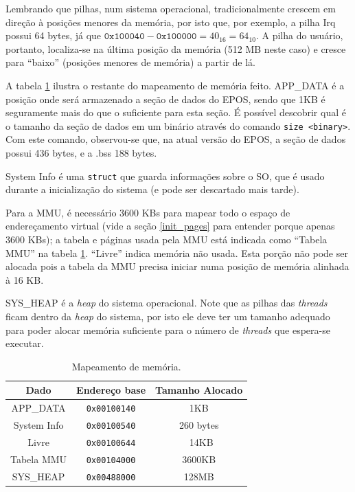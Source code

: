 Lembrando que pilhas, num sistema operacional, tradicionalmente crescem em direção à posições menores da memória, por isto que, por exemplo, a pilha Irq possui 64 bytes, já que $\texttt{0x100040}-\texttt{0x100000} = 40_{16} = 64_{10}$. A pilha do usuário, portanto, localiza-se na última posição da memória (512 MB neste caso) e cresce para ``baixo'' (posições menores de memória) a partir de lá.


A tabela \ref{tab:mem} ilustra o restante do mapeamento de memória feito. APP\_DATA é a posição onde será armazenado a seção de dados do EPOS, sendo que 1KB é seguramente mais do que o suficiente para esta seção. É possível descobrir qual é o tamanho da seção de dados em um binário através do comando \verb+size <binary>+. Com este comando, observou-se que, na atual versão do EPOS, a seção de dados possui 436 bytes, e a .bss 188 bytes.

System Info é uma \verb+struct+ que guarda informações sobre o SO, que é usado durante a inicialização do sistema (e pode ser descartado mais tarde).

Para a MMU, é necessário 3600 KBs para mapear todo o espaço de endereçamento virtual (vide a seção \ref{init_pages} para entender porque apenas 3600 KBs); a tabela e páginas usada pela MMU está indicada como ``Tabela MMU'' na tabela \ref{tab:mem}.
``Livre'' indica memória não usada. Esta porção não pode ser alocada pois a tabela da MMU precisa iniciar numa posição de memória alinhada à 16 KB.

SYS\_HEAP é a \emph{heap} do sistema operacional. Note que as pilhas das \emph{threads} ficam dentro da \emph{heap} do sistema, por isto ele deve ter um tamanho adequado para poder alocar memória suficiente para o número de \emph{threads} que espera-se executar.




\begin{table}[ht]
	\centering
	\begin{tabular}{ccc}
		\hline \hline
		Dado & Endereço base & Tamanho Alocado\\[0.5ex]
		\hline
		APP\_DATA		& \verb+0x00100140+ & 1KB\\
		System Info		& \verb+0x00100540+ & 260 bytes\\
		Livre			& \verb+0x00100644+ & ~14KB\\
		Tabela MMU		& \verb+0x00104000+ & 3600KB\\
		SYS\_HEAP		& \verb+0x00488000+ & 128MB\\[1ex]
		\hline
	\end{tabular}
	\caption{Mapeamento de memória.}
	\label{tab:mem}
\end{table}


